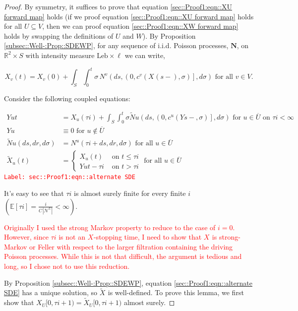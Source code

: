 \documentclass[12pt]{article}
\newcommand{\mb}{\mathbb}
\newcommand{\mc}{\mathcal}
\newcommand{\ov}{\overline}
\newcommand{\te}{\text}
\newcommand{\tr}{\textcolor{red}}
\newcommand{\labe}[1]{\tr{\texttt{Label: #1}}}
\newcommand{\ind}{\hspace{24pt}}
\newcommand{\ex}[1]{\mb{E}\left[#1\right]}			%
\renewcommand{\v}{v}							%
\newcommand{\vv}{u}								%
\renewcommand{\U}{U}							%
\newcommand{\UU}{W}								%
\renewcommand{\S}{S}							%
\newcommand{\s}{\sigma}							%
\renewcommand{\t}{t}							%
\renewcommand{\tt}{s}							%
\newcommand{\X}{X}								%
\newcommand{\IGr}{c}							%
\newcommand{\neigh}{\mc{N}}						%
\newcommand{\vind}[1]{^{#1}}					%
\newcommand{\cind}[1]{_{#1}}					%
\newcommand{\cl}{\ov}							%
\newcommand{\tp}[1]{(#1)}						%
\newcommand{\tip}[1]{#1}						%
\newcommand{\const}{C}							%
\newcommand{\poisses}{\mathbf{N}}				%
\newcommand{\poiss}{N}							%
\newcommand{\leb}{\te{Leb}}						%
\newcommand{\Sm}{\ell}							%
\renewcommand{\r}{r}							%
\newcommand{\alt}[1]{\widetilde{#1}}			%
\newcommand{\indx}[1]{_{#1}}					%
\newcommand{\XX}{Y}								%
\newcommand{\rt}{\tau}							%
\begin{document}
\begin{proof}
By symmetry, it suffices to prove that equation \ref{sec::Proof1:eqn::XU forward map} holds (if we proof equation \eqref{sec::Proof1:eqn::XU forward map} holds for all \(\U \subseteq V\), then we can proof equation \eqref{sec::Proof1:eqn::XW forward map} holds by swapping the definitions of \(\U\) and \(\UU\)). By Proposition \ref{subsec::Well-:Prop::SDEWP}, for any sequence of i.i.d. Poisson processes, \(\poisses\), on \(\mb{R}^2\times \S\) with intensity measure \(\leb\times\Sm\) we can write,

\[\X\cind{\v}\tp{\t} = \X\cind{\v}\tp{0} + \int_\S\int_0^\t \s\,\poiss\vind{\v}\left(d\tt,\left(0,\IGr\vind{\v}(\X\cind{}\tp{\tt-},\s)\right],d\s\right)\te{ for all } \v\in V.\]

Consider the following coupled equations:

\begin{align}
\XX{\vv}{\t} &= \X\cind{\vv}\tp{\rt{i}} + \int_\S\int_0^\t \s\alt{\poiss}{\vv}\left(d\tt,\left(0,\IGr\vind{\vv}(\XX{}{\tt-},\s)\right],d\s\right)\te{ for } \vv \in \cl{\U} \te{ on } \rt{i} < \infty \label{sec::Proof1:eqn::alternate SDE}\\
\XX{\vv}{} &\equiv 0\te{ for } \vv\notin \cl{\U}\nonumber\\
\alt{\poiss}{\vv}(d\tt,d\r,d\s) &= \poiss\vind{\vv}(\rt{i} + d\tt,d\r,d\s) \te{ for all }\vv\in \cl{\U}\nonumber\\
\alt{\X}\cind{\vv}\tp{\t} &= \begin{cases}
\X\cind{\vv}\tp{\t} &\te{ on } \t \leq \rt{i}\\
\XX{\vv}{\t - \rt{i}} &\te{ on } \t > \rt{i}
\end{cases} \te{ for all } \vv\in \cl{\U} \nonumber
\end{align}
\labe{sec::Proof1:eqn::alternate SDE}

It's easy to see that \(\rt{i}\) is almost surely finite for every finite \(i\) \(\left(\ex{\rt{i}} = \frac{i}{\const\indx{}|\neigh\vind{\U}|} < \infty\right)\). 

\ind \tr{Originally I used the strong Markov property to reduce to the case of \(i = 0\). However, since \(\rt{i}\) is not an \(\X\cind{}\tip{}\)-stopping time, I need to show that \(\X\cind{}\tip{}\) is strong-Markov or Feller with respect to the larger filtration containing the driving Poisson processes. While this is not that difficult, the argument is tedious and long, so I chose not to use this reduction.}

\ind By Proposition \ref{subsec::Well-:Prop::SDEWP}, equation \eqref{sec::Proof1:eqn::alternate SDE} has a unique solution, so \(\alt{\X}\cind{}\tip{}\) is well-defined. To prove this lemma, we first show that \(\X\cind{\U}\tip{[0,\rt{i+1})} = \alt{\X}\cind{\U}\tip{}{[0,\rt{i+1})}\) almost surely. 


\end{proof}
\end{document}
